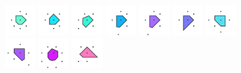 \documentclass[text.tex]{subfiles}
\begin{document}
\begin{figure}[h!]
\includegraphics[width=0.12\textwidth]{img/results/circle8/circle8_111810_(-2261_937alpha_1)_005.pdf}
\includegraphics[width=0.12\textwidth]{img/results/circle8/circle8_111810_(-2261_937alpha_1)_006.pdf}
\includegraphics[width=0.12\textwidth]{img/results/circle8/circle8_111810_(-2261_937alpha_1)_007.pdf}
\includegraphics[width=0.12\textwidth]{img/results/circle8/circle8_111810_(-2261_937alpha_1)_008.pdf}
\includegraphics[width=0.12\textwidth]{img/results/circle8/circle8_111810_(-2261_937alpha_1)_009.pdf}
\includegraphics[width=0.12\textwidth]{img/results/circle8/circle8_111810_(-2261_937alpha_1)_010.pdf}
\includegraphics[width=0.12\textwidth]{img/results/circle8/circle8_111810_(-2261_937alpha_1)_011.pdf}
\includegraphics[width=0.12\textwidth]{img/results/circle8/circle8_111810_(-2261_937alpha_1)_012.pdf}
\includegraphics[width=0.12\textwidth]{img/results/circle8/circle8_111810_(-2261_937alpha_1)_013.pdf}
\includegraphics[width=0.12\textwidth]{img/results/circle8/circle8_111810_(-2261_937alpha_1)_014.pdf}
\end{figure}
\end{document}
